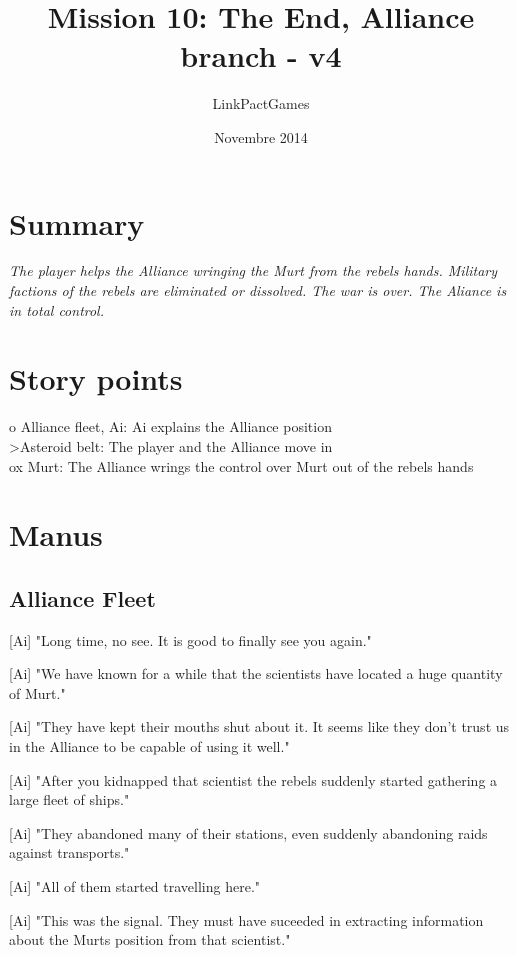 \documentclass[a4paper,12pt]{article}
\begin{document}
\title{Mission 10: The End, Alliance branch - v4}
\author{LinkPactGames}
\date{Novembre 2014}
\maketitle

\section{Summary}

\textit{The player helps the Alliance wringing the Murt from the rebels hands. Military factions
of the rebels are eliminated or dissolved. The war is over. The Aliance is in total control.}

\section{Story points}

o Alliance fleet, Ai: Ai explains the Alliance position\\
\textgreater Asteroid belt: The player and the Alliance move in\\
ox Murt: The Alliance wrings the control over Murt out of the rebels hands\\

\section{Manus}

\subsection{Alliance Fleet}

[Ai] "Long time, no see. It is good to finally see you again."

[Ai] "We have known for a while that the scientists have located a huge quantity of Murt."

[Ai] "They have kept their mouths shut about it. It seems like they don't trust us in the Alliance to be capable
of using it well."

[Ai] "After you kidnapped that scientist the rebels suddenly started gathering a large fleet of ships." 

[Ai] "They abandoned many of their stations, even suddenly abandoning raids against transports."

[Ai] "All of them started travelling here."

[Ai] "This was the signal. They must have suceeded in extracting information about the Murts position from that scientist."
\end{document}
